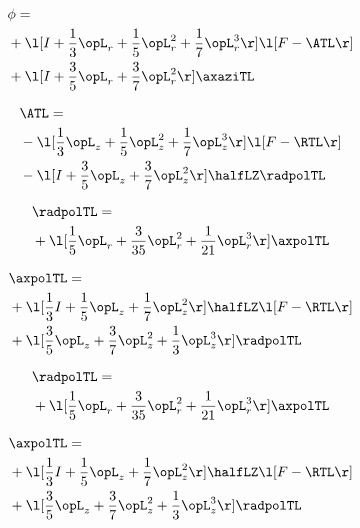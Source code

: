 \begin{alignat}{2} 
\label{eq:scalarFlux_0} 
& \phi = \\ 
& + \l[ I + \frac{1}{3} \opL_r + \frac{1}{5} \opL_r^{2} + \frac{1}{7} \opL_r^{3}  \r] \l[ F - \ATL \r] \nonumber \\ 
& + \l[ I + \frac{3}{5} \opL_r + \frac{3}{7} \opL_r^{2}  \r] \axaziTL \nonumber \\ 
\end{alignat} 


\begin{alignat}{2} 
\label{eq:isoATL_0} 
& \ATL = \\ 
& - \l[ \frac{1}{3} \opL_z + \frac{1}{5} \opL_z^{2} + \frac{1}{7} \opL_z^{3}  \r] \l[ F - \RTL \r] \nonumber \\ 
& - \l[ I + \frac{3}{5} \opL_z + \frac{3}{7} \opL_z^{2}  \r] \halfLZ \radpolTL \nonumber \\ 
\end{alignat} 


\begin{alignat}{2} 
\label{eq:linradpolTL_0} 
& \radpolTL = \\ 
& + \l[ \frac{1}{5} \opL_r + \frac{3}{35} \opL_r^{2} + \frac{1}{21} \opL_r^{3}  \r] \axpolTL \nonumber \\ 
\end{alignat} 


\begin{alignat}{2} 
\label{eq:linaxpolTL_0} 
& \axpolTL = \\ 
& + \l[ \frac{1}{3} I + \frac{1}{5} \opL_z + \frac{1}{7} \opL_z^{2}  \r] \halfLZ \l[ F - \RTL \r] \nonumber \\ 
& + \l[ \frac{3}{5} \opL_z + \frac{3}{7} \opL_z^{2} + \frac{1}{3} \opL_z^{3}  \r] \radpolTL \nonumber \\ 
\end{alignat} 


\begin{alignat}{2} 
\label{eq:linradpolTL_1} 
& \radpolTL = \\ 
& + \l[ \frac{1}{5} \opL_r + \frac{3}{35} \opL_r^{2} + \frac{1}{21} \opL_r^{3}  \r] \axpolTL \nonumber \\ 
\end{alignat} 


\begin{alignat}{2} 
\label{eq:linaxpolTL_1} 
& \axpolTL = \\ 
& + \l[ \frac{1}{3} I + \frac{1}{5} \opL_z + \frac{1}{7} \opL_z^{2}  \r] \halfLZ \l[ F - \RTL \r] \nonumber \\ 
& + \l[ \frac{3}{5} \opL_z + \frac{3}{7} \opL_z^{2} + \frac{1}{3} \opL_z^{3}  \r] \radpolTL \nonumber \\ 
\end{alignat} 



